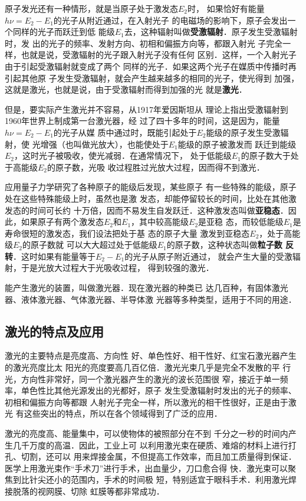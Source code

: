 原子发光还有一种情形，就是当原子处于激发态$E_2$时，
如果恰好有能量$h\nu =E_2-E_1$的光子从附近通过，在入射光子
的电磁场的影响下，原子会发出一个同样的光子而跃迁到低
能级$E_1$去，这种辐射叫做\textbf{受激辐射}．原子发生受激辐射时，发
出的光子的频率、发射方向、初相和偏振方向等，都跟入射光
子完全一样，也就是说，受激辐射的光子跟入射光子没有任何
区别．这样，一个入射光子由于引起受激辐射就变成了两个
同样的光子．如果这两个光子在媒质中传播时再引起其他原
子发生受激辐射，就会产生越来越多的相同的光子，使光得到
加强，这就是激光，也就是说，由于受激辐射而得到加强的光
就是\textbf{激光}．

但是，要实际产生激光并不容易，从1917年爱因斯坦从
理论上指出受激辐射到1960年世界上制成第一台激光器，经
过了四十多年的时间，这是因为，能量$h\nu =E_2-E_1$的光子从媒
质中通过时，既能引起处于$E_2$能级的原子发生受激辐射，使
光增强（也叫做光放大），也能使处于$E_1$能级的原子被激发而
跃迁到能级$E_2$，这时光子被吸收，使光减弱．在通常情况下，
处于低能级$E_1$的原子数大于处于高能级$E_2$的原子数，光吸
收过程胜过光放大过程，因而得不到激光．

应用量子力学研究了各种原子的能级后发现，某些原子
有一些特殊的能级，原子处在这些特殊能级上时，虽然也是激
发态，却能停留较长的时间，比处在其他激发态的时间可长约
十万倍，因而不易发生自发跃迁．这种激发态叫做\textbf{亚稳态}．因
此，如果原子有两个激发态$E_2$和$E_1$，其中较高能级$E_2$是亚稳
态，而较低能级$E_1$是寿命很短的激发态，我们设法把处于基
态的原子大量 激发到亚稳态$E_2$，处于高能级$E_2$的原子数就
可以大大超过处于低能级$E_1$的原子数，这种状态叫做\textbf{粒子数
反转}．这时如果有能量等于$E_2-E_1$的光子从原子附近通过，
就会产生大量的受激辐射，于是光放大过程大于光吸收过程，
得到较强的激光．

能产生激光的装置，叫做激光器．现在激光器的种类已
达几百种，有固体激光器、液体激光器、气体激光器、半导体激
光器等多种类型，适用于不同的用途．

\subsection{激光的特点及应用}

激光的主要特点是亮度高、方向性
好、单色性好、相干性好、红宝石激光器产生的激光亮度比太
阳光的亮度要高几百亿倍．激光光束几乎是完全不发散的平
行光，方向性非常好，同一个激光器产生的激光的波长范围很
窄，接近于单一频率，单色性比其他光源发出的光都好，原子
发生受激辐射时发出的光子的频率、初相和偏振方向等都跟
人射光子完全一样，所以激光的相干性很好，正是由于激光
有这些突出的特点，所以在各个领域得到了广泛的应用．

激光的亮度高、能量集中，可以使物体的被照部分在不到
千分之一秒的时间内产生几千万度的高温．因此，工业上可
以利用激光束在硬质、难熔的材料上进行打孔、切割，还可以
用来焊接金属，不但提高工作效率，而且加工质量得到保证．
医学上用激光束作“手术刀”进行手术，出血量少，刀口愈合得
快．激光束可以聚焦到比针尖还小的范围内，手术的时间极
短，特别适宜于眼科手术．利用激光焊接脱落的视网膜、切除
虹膜等都非常成功．

